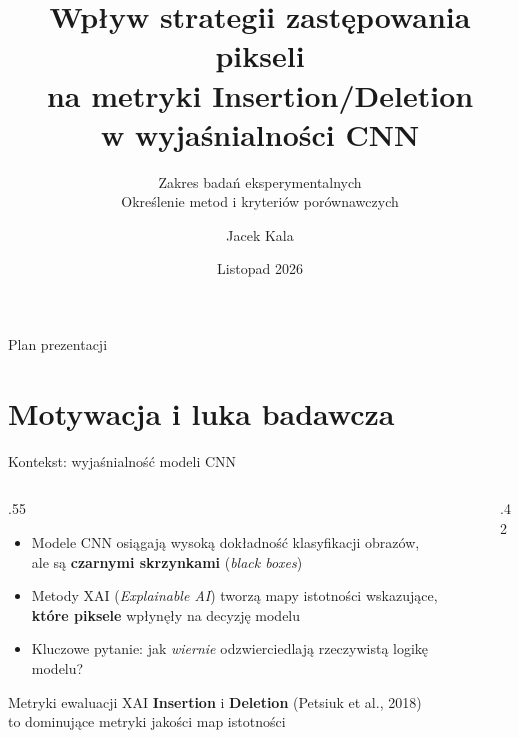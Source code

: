 \documentclass[aspectratio=169, 12pt]{beamer}
\title[XAI – Insertion/Deletion]{Wpływ strategii zastępowania pikseli\\
na metryki Insertion/Deletion\\
w wyjaśnialności CNN}
\subtitle{Zakres badań eksperymentalnych\\[4pt]
\small Określenie metod i kryteriów porównawczych}
\author[J. Kala]{Jacek Kala}
\institute{Studia magisterskie Data Science}
\date{Listopad 2026}
\begin{document}

\begin{frame}
  \titlepage
\end{frame}

\begin{frame}{Plan prezentacji}
  \tableofcontents
\end{frame}

\section{Motywacja i luka badawcza}

\begin{frame}{Kontekst: wyjaśnialność modeli CNN}
  \begin{columns}[T]
    \begin{column}{.55\textwidth}
      \begin{itemize}
        \item Modele CNN osiągają wysoką dokładność klasyfikacji obrazów,\\
              ale są \textbf{czarnymi skrzynkami} (\textit{black boxes})
        \item Metody XAI (\textit{Explainable AI}) tworzą mapy istotności
              wskazujące, \textbf{które piksele} wpłynęły na decyzję modelu
        \item Kluczowe pytanie: jak \emph{wiernie} odzwierciedlają
              rzeczywistą logikę modelu?
      \end{itemize}
      \vspace{6pt}
      \begin{block}{Metryki ewaluacji XAI}
        \textbf{Insertion} i \textbf{Deletion} (Petsiuk et al., 2018) \\
        to dominujące metryki jakości map istotności
      \end{block}
    \end{column}
    \begin{column}{.42\textwidth}
    \end{column}
  \end{columns}
\end{frame}
\end{document}
